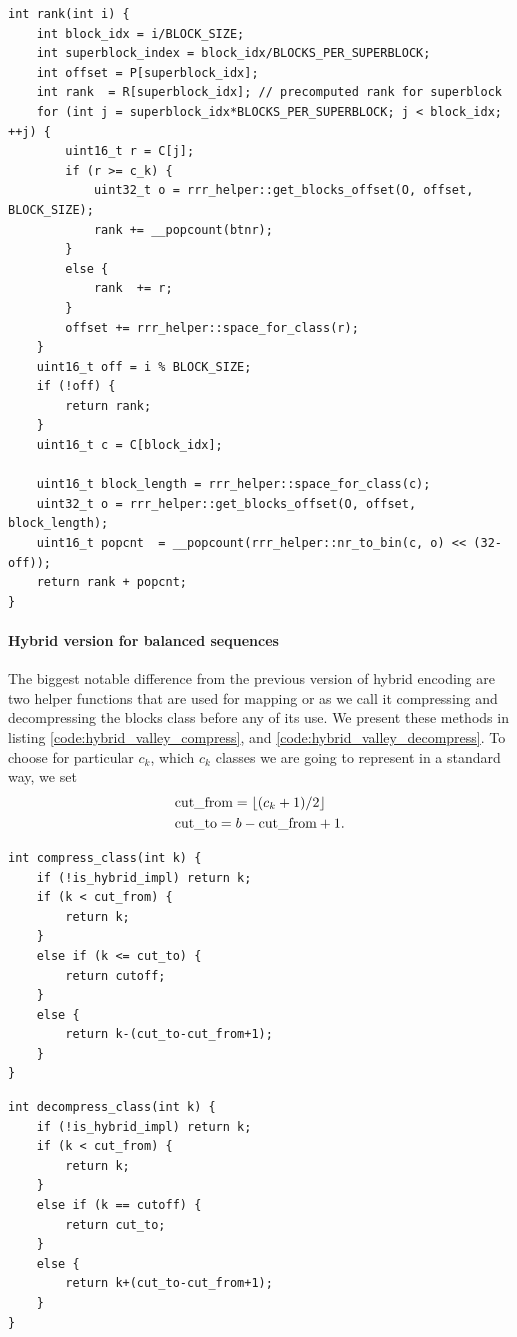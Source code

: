 \begin{lstlisting}
int rank(int i) {
	int block_idx = i/BLOCK_SIZE;
	int superblock_index = block_idx/BLOCKS_PER_SUPERBLOCK;
	int offset = P[superblock_idx];
	int rank  = R[superblock_idx]; // precomputed rank for superblock
	for (int j = superblock_idx*BLOCKS_PER_SUPERBLOCK; j < block_idx; ++j) {
		uint16_t r = C[j];
		if (r >= c_k) {
			uint32_t o = rrr_helper::get_blocks_offset(O, offset, BLOCK_SIZE);
			rank += __popcount(btnr);
		}
		else {
			rank  += r;
		}
		offset += rrr_helper::space_for_class(r);
	}
	uint16_t off = i % BLOCK_SIZE;
	if (!off) {
		return rank;
	}
	uint16_t c = C[block_idx];

	uint16_t block_length = rrr_helper::space_for_class(c);
	uint32_t o = rrr_helper::get_blocks_offset(O, offset, block_length);
	uint16_t popcnt  = __popcount(rrr_helper::nr_to_bin(c, o) << (32-off));
	return rank + popcnt;
}
\end{lstlisting}

\paragraph{Hybrid version for balanced sequences}

The biggest notable difference from the previous version of hybrid encoding are two
helper functions that are used for mapping or as we call it compressing and decompressing
the blocks class before any of its use. We present these methods in listing \ref{code:hybrid_valley_compress},
and \ref{code:hybrid_valley_decompress}. To choose for particular $c_k$, which $c_k$ classes we are
going to represent in a standard way, we set
\begin{align*} %
&\text{cut\_from} = \floor{(c_k+1)/2} \\
&\text{cut\_to} = b-\text{cut\_from}+1.
\end{align*}

\begin{lstlisting}
int compress_class(int k) {
	if (!is_hybrid_impl) return k;
	if (k < cut_from) {
		return k;
	}
	else if (k <= cut_to) {
		return cutoff;
	}
	else {
		return k-(cut_to-cut_from+1);
	}
}
\end{lstlisting}

\begin{lstlisting}
int decompress_class(int k) {
	if (!is_hybrid_impl) return k;
	if (k < cut_from) {
		return k;
	}
	else if (k == cutoff) {
		return cut_to;
	}
	else {
		return k+(cut_to-cut_from+1);
	}
}
\end{lstlisting}

